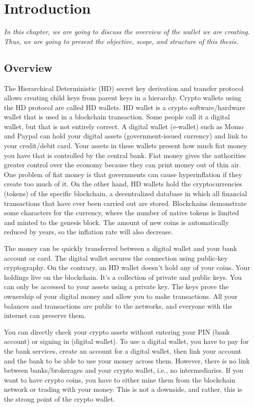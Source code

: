 \chapter{Introduction} 
\label{Introduction}
\textit{In this chapter, we are going to discuss the overview of the wallet we are creating. Thus, we are going to present the objective, scope, and structure
of this thesis.}

\minitoc

\section{Overview}
The Hierarchical Deterministic (HD) secret key derivation and transfer protocol allows creating child keys from parent keys in a hierarchy. Crypto wallets using the HD protocol are called HD wallets. HD wallet is a crypto software/hardware wallet that is used in a blockchain transaction. Some people call it a digital wallet, but that is not entirely correct. A digital wallet (e-wallet) such as Momo and Paypal can hold your digital assets (government-issued currency) and link to your credit/debit card. Your assets in these wallets present how much fiat money you have that is controlled by the central bank. Fiat money gives the authorities greater control over the economy because they can print money out of thin air. One problem of fiat money is that governments can cause hyperinflation if they create too much of it. On the other hand, HD wallets hold the cryptocurrencies (tokens) of the specific blockchain, a decentralized database in which all financial transactions that have ever been carried out are stored. Blockchains demonstrate some characters for the currency, where the number of native tokens is limited and minted to the genesis block. The amount of new coins is automatically reduced by years, so the inflation rate will also decrease.

The money can be quickly transferred between a digital wallet and your bank account or card. The digital wallet secures the connection using public-key cryptography. On the contrary, an HD wallet doesn’t hold any of your coins. Your holdings live on the blockchain. It’s a collection of private and public keys. You can only be accessed to your assets using a private key. The keys prove the ownership of your digital money and allow you to make transactions. All your balances and transactions are public to the networks, and everyone with the internet can preserve them.

You can directly check your crypto assets without entering your PIN (bank account) or signing in (digital wallet). To use a digital wallet, you have to pay for the bank services, create an account for a digital wallet, then link your account and the bank to be able to use your money across them. However, there is no link between banks/brokerages and your crypto wallet, i.e., no intermediaries. If you want to have crypto coins, you have to either mine them from the blockchain network or trading with your money. This is not a downside, and rather, this is the strong point of the crypto wallet.

